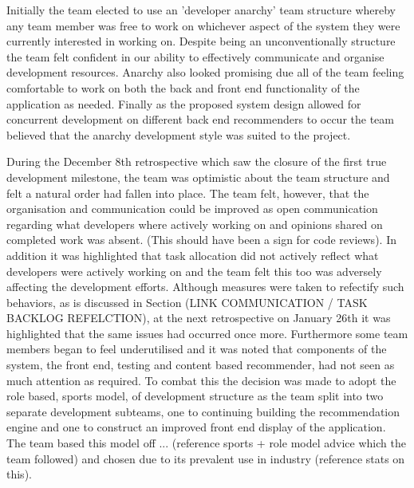 \documentclass{l3proj}
\begin{document}


Initially the team elected to use an 'developer anarchy' team structure whereby any team member was free to work on whichever aspect of the system they were currently interested in working on. Despite being an unconventionally structure the team felt confident in our ability to effectively communicate and organise development resources. Anarchy also looked promising due all of the team feeling comfortable to work on both the back and front end functionality of the application as needed. Finally as the proposed system design allowed for concurrent development on different back end recommenders to occur the team believed that the anarchy development style was suited to the project.

During the December 8th retrospective which saw the closure of the first true development milestone, the team was optimistic about the team structure and felt a natural order had fallen into place. The team felt, however, that the organisation and communication could be improved as open communication regarding what developers where actively working on and opinions shared on completed work was absent. (This should have been a sign for code reviews). In addition it was highlighted that task allocation did not actively reflect what developers were actively working on and the team felt this too was adversely affecting the development efforts. Although measures were taken to refectify such behaviors, as is discussed in Section (LINK COMMUNICATION / TASK BACKLOG REFELCTION), at the next retrospective on January 26th it was highlighted that the same issues had occurred once more. Furthermore some team members began to feel underutilised and it was noted that components of the system, the front end, testing and content based recommender, had not seen as much attention as required. To combat this the decision was made to adopt the role based, sports model, of development structure as the team split into two separate development subteams, one to continuing building the recommendation engine and one to construct an improved front end display of the application. The team based this model off ... (reference sports + role model advice which the team followed) and chosen due to its prevalent use in industry (reference stats on this).
\end{document}

